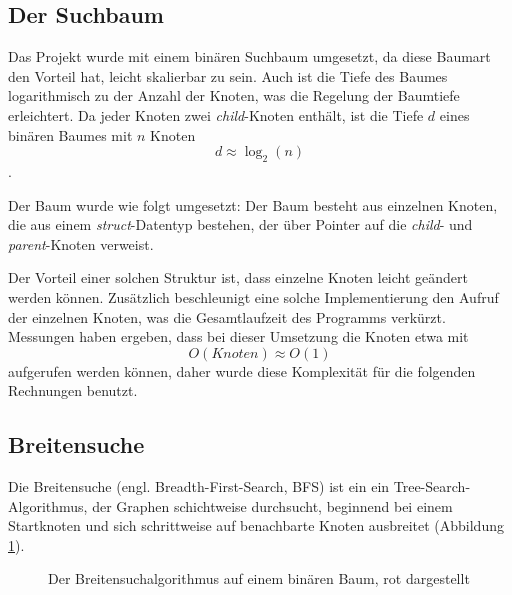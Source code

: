 \documentclass[a4paper,11pt]{article}
\begin{document}
\subsection{Der Suchbaum}
Das Projekt wurde mit einem binären Suchbaum umgesetzt, da diese Baumart den Vorteil hat, leicht skalierbar zu sein. Auch ist die Tiefe des Baumes logarithmisch zu der Anzahl der Knoten, was die Regelung der Baumtiefe erleichtert. Da jeder Knoten zwei \emph{child}-Knoten enthält, ist die Tiefe $d$ eines binären Baumes mit $n$ Knoten $$d \approx \log_2(n)$$ \cite{c2_algorithms}. %

Der Baum wurde wie folgt umgesetzt: Der Baum besteht aus einzelnen Knoten, die aus einem \emph{struct}-Datentyp bestehen, der über Pointer auf die \emph{child}- und \emph{parent}-Knoten verweist.



Der Vorteil einer solchen Struktur ist, dass einzelne Knoten leicht geändert werden können. Zusätzlich beschleunigt eine solche Implementierung den Aufruf der einzelnen Knoten, was die Gesamtlaufzeit des Programms verkürzt. Messungen haben ergeben, dass bei dieser Umsetzung die Knoten etwa mit $$O(Knoten) \approx O(1)$$ aufgerufen werden können, daher wurde diese Komplexität für die folgenden Rechnungen benutzt.


\subsection{Breitensuche}

Die Breitensuche (engl. Breadth-First-Search, BFS) ist ein ein Tree-Search-Algorithmus, der Graphen schichtweise durchsucht, beginnend bei einem Startknoten und sich schrittweise auf benachbarte Knoten ausbreitet (Abbildung \ref{fig:binary_tree_bfs}).

\begin{figure}[htbp]
\centering
{}
\caption{Der Breitensuchalgorithmus auf einem binären Baum, rot dargestellt}
\label{fig:binary_tree_bfs}
\end{figure}
\end{document}
